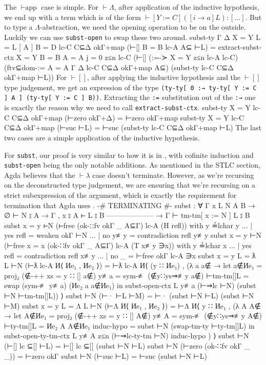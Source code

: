 \documentclass[logo,bsc,singlespacing,parskip,online]{infthesis}
\renewenvironment{code}{\mintedcopy[breaklines,breaksymbolleft=\;]{agda}}{\endmintedcopy}
\begin{document}
The $\vdash\text{app}$ case is simple. For $\vdash\Lambda$, after application of the inductive
hypothesis, we end up with a term which is of the form $\vdash [Y := C] ([i \to a] L) \colon [...]$.
But to type a $\Lambda$-abstraction, we need the opening operation to be on the outside. Luckily we
can use \texttt{subst-open} to swap these two around.
\begin{code}
  subst-ty {Γ} {Δ} {X = Y} {L = L [ A ]} {B = D} lc-C C⊆Δ okΓ+map (⊢[] {B = B} lc-A A⊆ ⊢L) =
    extract-subst-ctx {X = Y} {B = B} {A = A} {j = 0} z≤n lc-C
      (⊢[] (:=-≻ {X = Y} z≤n lc-A lc-C) (ftv⊆dom-:= {A = A} Γ Δ lc-C C⊆Δ okΓ+map A⊆) (subst-ty lc-C C⊆Δ okΓ+map ⊢L))
\end{code}
For $\vdash[]$, after applying the inductive hypothesis and the $\vdash[]$ type judgement, we get an
expression of the type \texttt{(ty-ty[ 0 :→ ty-ty[ Y := C ] A ] (ty-ty[ Y := C ] B))}. Extracting
the \texttt{:=} substitution out of the \texttt{:→} one is exactly the reason why we need to call
\texttt{extract-subst-ctx}.
\begin{code}
  subst-ty {X = Y} lc-C C⊆Δ okΓ+map (⊢zero okΓ+Δ) = ⊢zero okΓ+map
  subst-ty {X = Y} lc-C C⊆Δ okΓ+map (⊢suc ⊢L) = ⊢suc (subst-ty lc-C C⊆Δ okΓ+map ⊢L)
\end{code}
The last two cases are a simple application of the inductive hypothesis.

For \texttt{subst}, our proof is very similar to how it is in \citet{wadler_programming_2022}, with
cofinite induction and \texttt{subst-open} being the only notable additions. As mentioned in the
STLC section, Agda believes that the $\vdash\lambda$ case doesn't terminate. However, as we're
recursing on the deconstructed type judgement, we are ensuring that we're recursing on a strict
subexpression of the argument, which is exactly the requirement for termination that Agda uses
\citep{the_agda_community_termination_2024}.
\begin{code}
  {-# TERMINATING #-}
  subst : ∀ {Γ x L N A B}
    → ∅ ⊢ N ⦂ A
    → Γ , x ⦂ A ⊢ L ⦂ B
      --------------------
    → Γ ⊢ tm-tm[ x := N ] L ⦂ B
  subst {x = y} ⊢N (⊢free (ok-∷fv okΓ _ A⊆Γ) lc-A (H refl)) with y ≟lchar y
  ... | yes refl = weaken okΓ ⊢N
  ... | no  y≢y  = contradiction refl y≢y
  subst {x = y} ⊢N (⊢free {x = x} (ok-∷fv okΓ _ A⊆Γ) lc-A (T x≢y ∋x)) with y ≟lchar x
  ... | yes refl = contradiction refl x≢y
  ... | no  _    = ⊢free okΓ lc-A ∋x
  subst {x = y} {L = ƛ L} ⊢N (⊢ƛ lc-A И⟨ Иe₁ , Иe₂ ⟩) =
    ⊢ƛ lc-A И⟨ (y ∷ Иe₁) , (λ a {a∉} →
      let a∉Иe₁ = proj₂ (∉-++ {xs = y ∷ []} a∉)
          y≢a = sym-≢ (∉y∷ys⇒≢y a∉)
          ⊢tm-tm[]L = swap (sym-≢ y≢a) (Иe₂ a {a∉Иe₁})
      in subst-open-ctx L y≢a (⊢⇒lc ⊢N) (subst ⊢N ⊢tm-tm[]L)) ⟩
  subst ⊢N (⊢· ⊢L ⊢M) = ⊢· (subst ⊢N ⊢L) (subst ⊢N ⊢M)
  subst {x = y} {L = Λ L} ⊢N (⊢Λ И⟨ Иe₁ , Иe₂ ⟩) =
    ⊢Λ И⟨ y ∷ Иe₁ , (λ A {A∉} →
      let A∉Иe₁ = proj₂ (∉-++ {xs = y ∷ []} A∉)
          y≢A = sym-≢ (∉y∷ys⇒≢y A∉)
          ⊢ty-tm[]L = Иe₂ A {A∉Иe₁}
          induc-hypo = subst ⊢N (swap-tm-ty ⊢ty-tm[]L)
      in subst-open-ty-tm-ctx L y≢A z≤n (⊢⇒lc-ty-tm ⊢N) induc-hypo ) ⟩
  subst ⊢N (⊢[] lc ⊆[] ⊢L) = ⊢[] lc ⊆[] (subst ⊢N ⊢L)
  subst ⊢N (⊢zero (ok-∷fv okΓ _ _)) = ⊢zero okΓ
  subst ⊢N (⊢suc ⊢L) = ⊢suc (subst ⊢N ⊢L)
\end{code}
\end{document}
